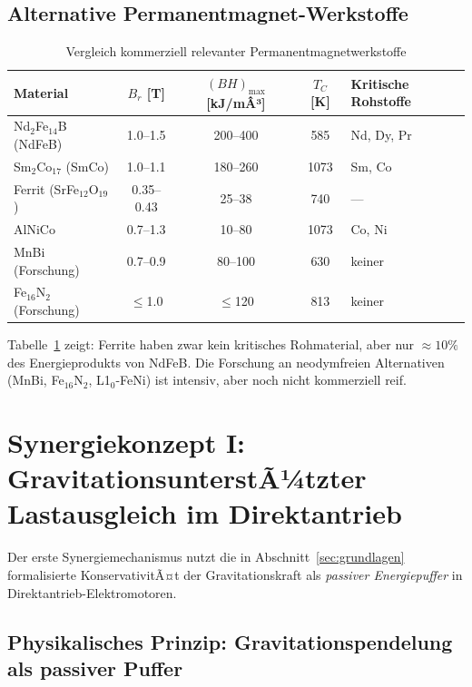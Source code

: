 ﻿\documentclass[12pt, a4paper]{report}
\theoremstyle{definition}
\theoremstyle{remark}
\begin{document}
\subsection{Alternative Permanentmagnet-Werkstoffe}

\begin{table}[H]
  \centering
  \caption{Vergleich kommerziell relevanter Permanentmagnetwerkstoffe}
  \label{tab:magnete}
  \begin{tabular}{lcccl}
    \toprule
    \textbf{Material} & $B_r$ [T] & $(BH)_{\max}$ [kJ/mÂ³] & $T_C$ [K]
    & \textbf{Kritische Rohstoffe} \\
    \midrule
    Nd$_2$Fe$_{14}$B (NdFeB) & 1.0--1.5 & 200--400 & 585 & Nd, Dy, Pr \\
    Sm$_2$Co$_{17}$ (SmCo)   & 1.0--1.1 & 180--260 & 1073 & Sm, Co \\
    Ferrit (SrFe$_{12}$O$_{19}$) & 0.35--0.43 & 25--38 & 740 & --- \\
    AlNiCo                    & 0.7--1.3 & 10--80  & 1073 & Co, Ni \\
    MnBi (Forschung)          & 0.7--0.9 & 80--100 & 630  & keiner \\
    Fe$_{16}$N$_2$ (Forschung) & $\leq$1.0  & $\leq$120 & 813  & keiner \\
    \bottomrule
  \end{tabular}
\end{table}

Tabelle~\ref{tab:magnete} zeigt: Ferrite haben zwar kein kritisches Rohmaterial,
aber nur $\approx 10\%$ des Energieprodukts von NdFeB. Die Forschung an
neodymfreien Alternativen (MnBi, Fe$_{16}$N$_2$, L1$_0$-FeNi) ist intensiv,
aber noch nicht kommerziell reif.

\section{Synergiekonzept I: GravitationsunterstÃ¼tzter Lastausgleich im
            Direktantrieb}
\label{ssec:synergie1}

Der erste Synergiemechanismus nutzt die in Abschnitt~\ref{sec:grundlagen}
formalisierte KonservativitÃ¤t der Gravitationskraft als \emph{passiver
Energiepuffer} in Direktantrieb-Elektromotoren.

\subsection{Physikalisches Prinzip: Gravitationspendelung als passiver Puffer}
\end{document}
